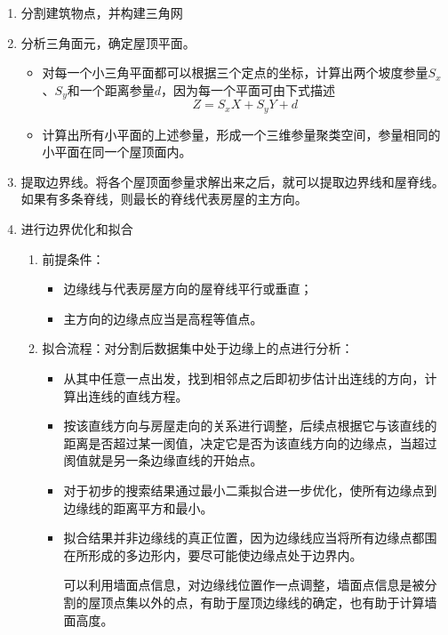 \begin{enumerate}
	\item 分割建筑物点，并构建三角网
	\item 分析三角面元，确定屋顶平面。
		\begin{itemize}
			\item 对每一个小三角平面都可以根据三个定点的坐标，计算出两个坡度参量$ S_x$、$ S_y $和一个距离参量$ d $，因为每一个平面可由下式描述
				\begin{equation}
				Z = S_x X + S_y Y + d
				\end{equation}
			\item 计算出所有小平面的上述参量，形成一个三维参量聚类空间，参量相同的小平面在同一个屋顶面内。
		\end{itemize}
	\item 提取边界线。将各个屋顶面参量求解出来之后，就可以提取边界线和屋脊线。如果有多条脊线，则最长的脊线代表房屋的主方向。
	\item 进行边界优化和拟合
		\begin{enumerate}
			\item 前提条件：
				\begin{itemize}
					\item 边缘线与代表房屋方向的屋脊线平行或垂直；
					\item 主方向的边缘点应当是高程等值点。
				\end{itemize}
			\item 拟合流程：对分割后数据集中处于边缘上的点进行分析：
				\begin{itemize}
					\item 从其中任意一点出发，找到相邻点之后即初步估计出连线的方向，计算出连线的直线方程。
					\item 按该直线方向与房屋走向的关系进行调整，后续点根据它与该直线的距离是否超过某一阂值，决定它是否为该直线方向的边缘点，当超过阂值就是另一条边缘直线的开始点。
					\item 对于初步的搜索结果通过最小二乘拟合进一步优化，使所有边缘点到边缘线的距离平方和最小。
					\item 拟合结果并非边缘线的真正位置，因为边缘线应当将所有边缘点都围在所形成的多边形内，要尽可能使边缘点处于边界内。
					
					可以利用墙面点信息，对边缘线位置作一点调整，墙面点信息是被分割的屋顶点集以外的点，有助于屋顶边缘线的确定，也有助于计算墙面高度。
				\end{itemize}
		\end{enumerate}
\end{enumerate}

